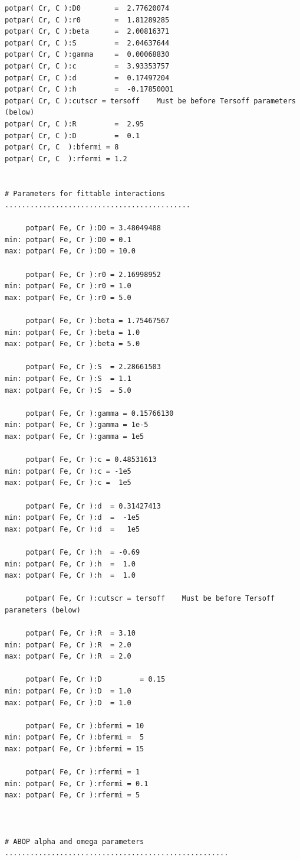 \documentclass[a4paper,12pt,pdftex,onecolumn]{article}
\begin{document}
\begin{Verbatim}[fontsize=\relsize{-1},frame=single]
potpar( Cr, C ):D0        =  2.77620074
potpar( Cr, C ):r0        =  1.81289285
potpar( Cr, C ):beta      =  2.00816371
potpar( Cr, C ):S         =  2.04637644
potpar( Cr, C ):gamma     =  0.00068830
potpar( Cr, C ):c         =  3.93353757
potpar( Cr, C ):d         =  0.17497204
potpar( Cr, C ):h         =  -0.17850001
potpar( Cr, C ):cutscr = tersoff    Must be before Tersoff parameters (below)
potpar( Cr, C ):R         =  2.95
potpar( Cr, C ):D         =  0.1
potpar( Cr, C  ):bfermi = 8
potpar( Cr, C  ):rfermi = 1.2


# Parameters for fittable interactions ............................................

     potpar( Fe, Cr ):D0 = 3.48049488
min: potpar( Fe, Cr ):D0 = 0.1
max: potpar( Fe, Cr ):D0 = 10.0

     potpar( Fe, Cr ):r0 = 2.16998952
min: potpar( Fe, Cr ):r0 = 1.0
max: potpar( Fe, Cr ):r0 = 5.0

     potpar( Fe, Cr ):beta = 1.75467567
min: potpar( Fe, Cr ):beta = 1.0
max: potpar( Fe, Cr ):beta = 5.0

     potpar( Fe, Cr ):S  = 2.28661503
min: potpar( Fe, Cr ):S  = 1.1
max: potpar( Fe, Cr ):S  = 5.0

     potpar( Fe, Cr ):gamma = 0.15766130
min: potpar( Fe, Cr ):gamma = 1e-5
max: potpar( Fe, Cr ):gamma = 1e5

     potpar( Fe, Cr ):c = 0.48531613
min: potpar( Fe, Cr ):c = -1e5
max: potpar( Fe, Cr ):c =  1e5

     potpar( Fe, Cr ):d  = 0.31427413
min: potpar( Fe, Cr ):d  =  -1e5
max: potpar( Fe, Cr ):d  =   1e5

     potpar( Fe, Cr ):h  = -0.69
min: potpar( Fe, Cr ):h  =  1.0
max: potpar( Fe, Cr ):h  =  1.0

     potpar( Fe, Cr ):cutscr = tersoff    Must be before Tersoff parameters (below)

     potpar( Fe, Cr ):R  = 3.10
min: potpar( Fe, Cr ):R  = 2.0
max: potpar( Fe, Cr ):R  = 2.0

     potpar( Fe, Cr ):D         = 0.15
min: potpar( Fe, Cr ):D  = 1.0
max: potpar( Fe, Cr ):D  = 1.0

     potpar( Fe, Cr ):bfermi = 10
min: potpar( Fe, Cr ):bfermi =  5
max: potpar( Fe, Cr ):bfermi = 15

     potpar( Fe, Cr ):rfermi = 1
min: potpar( Fe, Cr ):rfermi = 0.1
max: potpar( Fe, Cr ):rfermi = 5



# ABOP alpha and omega parameters .....................................................


\end{Verbatim}
\end{document}
